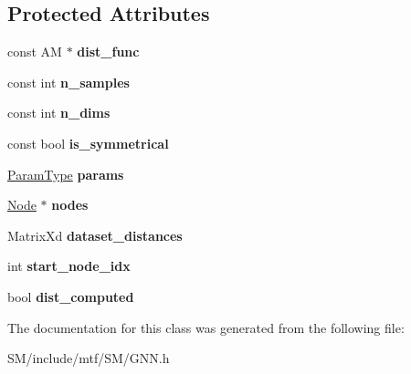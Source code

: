 \subsection*{Protected Attributes}
\begin{DoxyCompactItemize}
\item 
\hypertarget{classgnn_1_1GNN_a3ac4ebdff631df1852fbeebef513230b}{const A\-M $\ast$ {\bfseries dist\-\_\-func}}\label{classgnn_1_1GNN_a3ac4ebdff631df1852fbeebef513230b}

\item 
\hypertarget{classgnn_1_1GNN_aab908567c880074067e9ca6e332ed66f}{const int {\bfseries n\-\_\-samples}}\label{classgnn_1_1GNN_aab908567c880074067e9ca6e332ed66f}

\item 
\hypertarget{classgnn_1_1GNN_a70eab0aebf2978f956da3b9473388219}{const int {\bfseries n\-\_\-dims}}\label{classgnn_1_1GNN_a70eab0aebf2978f956da3b9473388219}

\item 
\hypertarget{classgnn_1_1GNN_a06f37f0a5fd5133a600c22bd4ae4d95b}{const bool {\bfseries is\-\_\-symmetrical}}\label{classgnn_1_1GNN_a06f37f0a5fd5133a600c22bd4ae4d95b}

\item 
\hypertarget{classgnn_1_1GNN_a49104d6ec9519fa8c19307639c8571ba}{\hyperlink{structgnn_1_1GNNParams}{Param\-Type} {\bfseries params}}\label{classgnn_1_1GNN_a49104d6ec9519fa8c19307639c8571ba}

\item 
\hypertarget{classgnn_1_1GNN_a5ed6bcf9456fde5882e230f20e71b6b4}{\hyperlink{structgnn_1_1Node}{Node} $\ast$ {\bfseries nodes}}\label{classgnn_1_1GNN_a5ed6bcf9456fde5882e230f20e71b6b4}

\item 
\hypertarget{classgnn_1_1GNN_a73c75358d06d65299f143e117d3e3c13}{Matrix\-Xd {\bfseries dataset\-\_\-distances}}\label{classgnn_1_1GNN_a73c75358d06d65299f143e117d3e3c13}

\item 
\hypertarget{classgnn_1_1GNN_a0b418512ff0aa7b8ce2f8ca0cc3dcbf9}{int {\bfseries start\-\_\-node\-\_\-idx}}\label{classgnn_1_1GNN_a0b418512ff0aa7b8ce2f8ca0cc3dcbf9}

\item 
\hypertarget{classgnn_1_1GNN_ac07236c6c6325311cbd861735418272d}{bool {\bfseries dist\-\_\-computed}}\label{classgnn_1_1GNN_ac07236c6c6325311cbd861735418272d}

\end{DoxyCompactItemize}


The documentation for this class was generated from the following file\-:\begin{DoxyCompactItemize}
\item 
S\-M/include/mtf/\-S\-M/G\-N\-N.\-h\end{DoxyCompactItemize}
